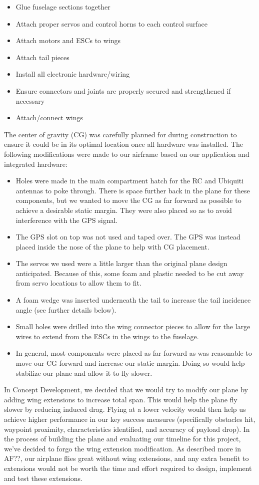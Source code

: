 \documentclass[]{auvsi_doc}
\begin{document}
\begin{itemize}
	\item Glue fuselage sections together
	\item Attach proper servos and control horns to each control surface
	\item Attach motors and ESCs to wings
	\item Attach tail pieces
	\item Install all electronic hardware/wiring
	\item Ensure connectors and joints are properly secured and strengthened if necessary
	\item Attach/connect wings
\end{itemize}

The center of gravity (CG) was carefully planned for during construction to ensure it could be in its optimal location once all hardware was installed. The following modifications were made to our airframe based on our application and integrated hardware:

\begin{itemize}
	\item Holes were made in the main compartment hatch for the RC and Ubiquiti antennas to poke through. There is space further back in the plane for these components, but we wanted to move the CG as far forward as possible to achieve a desirable static margin. They were also placed so as to avoid interference with the GPS signal.
	\item The GPS slot on top was not used and taped over. The GPS was instead placed inside the nose of the plane to help with CG placement.
	\item The servos we used were a little larger than the original plane design anticipated. Because of this, some foam and plastic  needed to be cut away from servo locations to allow them to fit.
	\item A foam wedge was inserted underneath the tail to increase the tail incidence angle (see further details below).
	\item Small holes were drilled into the wing connector pieces to allow for the large wires to extend from the ESCs in the wings to the fuselage.
	\item In general, most components were placed as far forward as was reasonable to move our CG forward and increase our static margin. Doing so would help stabilize our plane and allow it to fly slower.
\end{itemize}

In Concept Development, we decided that we would try to modify our plane by adding wing extensions to increase total span. This would help the plane fly slower by reducing induced drag. Flying at a lower velocity would then help us achieve higher performance in our key success measures (specifically obstacles hit, waypoint proximity, characteristics identified, and accuracy of payload drop). In the process of building the plane and evaluating our timeline for this project, we've decided to forgo the wing extension modification. As described more in AF??, our airplane flies great without wing extensions, and any extra benefit to extensions would not be worth the time and effort required to design, implement and test these extensions.
\end{document}
